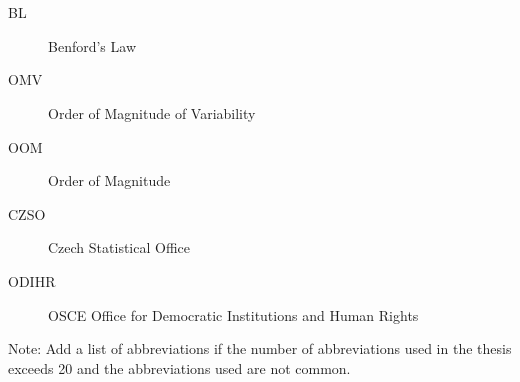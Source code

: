 \chapter*{\SeznamZkratek}

\begin{multicols}{2}
\raggedright
\begin{description}
\item [BL] Benford's Law
\item [OMV] Order of Magnitude of Variability
\item [OOM] Order of Magnitude
\item [CZSO] Czech Statistical Office
\item [ODIHR] OSCE Office for Democratic Institutions and Human Rights

\end{description}
\end{multicols}

Note: Add a list of abbreviations if the number of abbreviations used in the thesis exceeds 20 and the abbreviations used are not common.